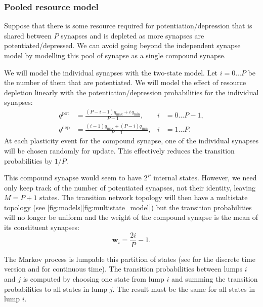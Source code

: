 \documentclass[12pt]{article}
\newcommand{\w}{\mathbf{w}}
\newcommand{\pot}{^{\text{pot}}}
\newcommand{\dep}{^{\text{dep}}}
\newcommand{\lmax}{_{\text{max}}}
\newcommand{\lmin}{_{\text{min}}}
\begin{document}
\subsubsection{Pooled resource model}\label{sec:pooledmodel}

Suppose that there is some resource required for potentiation/depression that is shared between $P$ synapses and is depleted as more synapses are potentiated/depressed.
We can avoid going beyond the independent synapse model by modelling this pool of synapse as a single compound synapse.

We will model the individual synapses with the two-state model.
Let $i=0\ldots P$ be the number of them that are potentiated.
We will model the effect of resource depletion linearly with the potentiation/depression probabilities for the individual synapses:
%
\begin{equation}\label{eq:depletion}
  \begin{aligned}
    q\pot &= \frac{(P-i-1)q\lmax + i\,q\lmin}{P-1}, \quad& i &= 0 \ldots P-1,\\
    q\dep &= \frac{(i-1)q\lmax + (P-i)q\lmin}{P-1}, & i &= 1 \ldots P.
  \end{aligned}
\end{equation}
%
At each plasticity event for the compound synapse, one of the individual synapses will be chosen randomly for update.
This effectively reduces the transition probabilities by $1/P$.

This compound synapse would seem to have $2^P$ internal states.
However, we need only keep track of the number of potentiated synapses, not their identity, leaving $M=P+1$ states.
The transition network topology will then have a multistate topology (see \autoref{fig:models}\ref{fig:multistate_model}) but the transition probabilities will no longer be uniform and the weight of the compound synapse is the mean of its constituent synapses:
%
\begin{equation}\label{eq:pooledweight}
  \w_i = \frac{2i}{P}-1.
\end{equation}
%


The Markov process is lumpable \wrt this partition of states (see \cite[\S6.3]{kemeny1960finite} for the discrete time version and \cite{burke1958markovian,Ball1993Lumpability} for continuous time).
The transition probabilities between lumps $i$ and $j$ is computed by choosing one state from lump $i$ and summing the transition probabilities to all states in lump $j$.
The result must be the same for all states in lump $i$.
\end{document}
